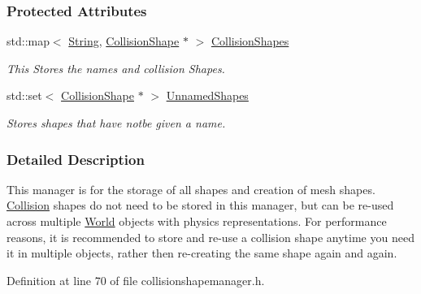 \subsubsection*{Protected Attributes}
\begin{DoxyCompactItemize}
\item 
\hypertarget{classMezzanine_1_1CollisionShapeManager_abbb1fe3fe33590c524d9b43629530171}{
std::map$<$ \hyperlink{namespaceMezzanine_acf9fcc130e6ebf08e3d8491aebcf1c86}{String}, \hyperlink{classMezzanine_1_1CollisionShape}{CollisionShape} $\ast$ $>$ \hyperlink{classMezzanine_1_1CollisionShapeManager_abbb1fe3fe33590c524d9b43629530171}{CollisionShapes}}
\label{classMezzanine_1_1CollisionShapeManager_abbb1fe3fe33590c524d9b43629530171}

\begin{DoxyCompactList}\small\item\em This Stores the names and collision Shapes. \item\end{DoxyCompactList}\item 
\hypertarget{classMezzanine_1_1CollisionShapeManager_ab54d750482b016f93b2800323592e779}{
std::set$<$ \hyperlink{classMezzanine_1_1CollisionShape}{CollisionShape} $\ast$ $>$ \hyperlink{classMezzanine_1_1CollisionShapeManager_ab54d750482b016f93b2800323592e779}{UnnamedShapes}}
\label{classMezzanine_1_1CollisionShapeManager_ab54d750482b016f93b2800323592e779}

\begin{DoxyCompactList}\small\item\em Stores shapes that have notbe given a name. \item\end{DoxyCompactList}\end{DoxyCompactItemize}


\subsubsection{Detailed Description}
This manager is for the storage of all shapes and creation of mesh shapes. \hyperlink{classMezzanine_1_1Collision}{Collision} shapes do not need to be stored in this manager, but can be re-\/used across multiple \hyperlink{classMezzanine_1_1World}{World} objects with physics representations. For performance reasons, it is recommended to store and re-\/use a collision shape anytime you need it in multiple objects, rather then re-\/creating the same shape again and again. 

Definition at line 70 of file collisionshapemanager.h.



